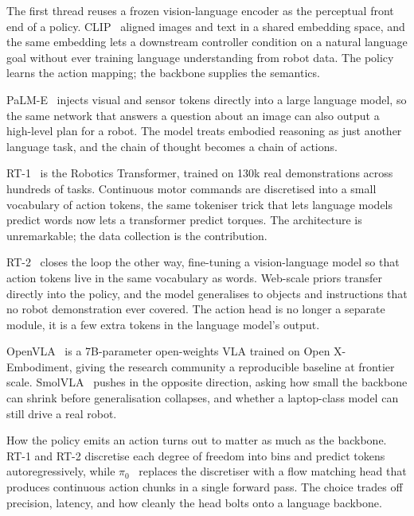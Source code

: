 The first thread reuses a frozen vision-language encoder as the perceptual front end of a policy.
CLIP~\cite{Radford2021CLIP} aligned images and text in a shared embedding space,
and the same embedding lets a downstream controller condition on a natural language goal
without ever training language understanding from robot data.
The policy learns the action mapping; the backbone supplies the semantics.

PaLM-E~\cite{Driess2023PaLME} injects visual and sensor tokens directly into a large language model,
so the same network that answers a question about an image can also output a high-level plan for a robot.
The model treats embodied reasoning as just another language task,
and the chain of thought becomes a chain of actions.

RT-1~\cite{Brohan2022RT1} is the Robotics Transformer,
trained on 130k real demonstrations across hundreds of tasks.
Continuous motor commands are discretised into a small vocabulary of action tokens,
the same tokeniser trick that lets language models predict words now lets a transformer predict torques.
The architecture is unremarkable; the data collection is the contribution.

RT-2~\cite{Brohan2023RT2} closes the loop the other way,
fine-tuning a vision-language model so that action tokens live in the same vocabulary as words.
Web-scale priors transfer directly into the policy,
and the model generalises to objects and instructions that no robot demonstration ever covered.
The action head is no longer a separate module, it is a few extra tokens in the language model's output.

OpenVLA~\cite{Kim2024OpenVLA} is a 7B-parameter open-weights VLA trained on Open X-Embodiment,
giving the research community a reproducible baseline at frontier scale.
SmolVLA~\cite{Shukor2025SmolVLA} pushes in the opposite direction,
asking how small the backbone can shrink before generalisation collapses,
and whether a laptop-class model can still drive a real robot.

How the policy emits an action turns out to matter as much as the backbone.
RT-1 and RT-2 discretise each degree of freedom into bins and predict tokens autoregressively,
while $\pi_0$~\cite{Black2024Pi0} replaces the discretiser with a flow matching head
that produces continuous action chunks in a single forward pass.
The choice trades off precision, latency, and how cleanly the head bolts onto a language backbone.

